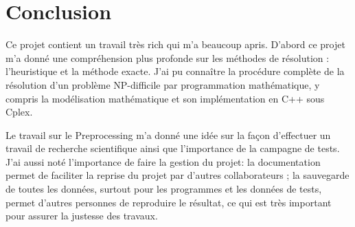 \chapter{Conclusion}
Ce projet contient un travail très rich qui m'a beaucoup apris. D'abord ce projet m'a donné une compréhension plus profonde sur les méthodes de résolution : l'heuristique et la méthode exacte. J'ai pu connaître la procédure complète de la résolution d'un problème NP-difficile par programmation mathématique, y compris la modélisation mathématique et son implémentation en C++ sous Cplex.

Le travail sur le Preprocessing m'a donné une idée sur la façon d'effectuer un travail de recherche scientifique ainsi que l'importance de la campagne de tests. J'ai aussi noté l'importance de faire la gestion du projet: la documentation permet de faciliter la reprise du projet par d'autres collaborateurs ; la sauvegarde de toutes les données, surtout pour les programmes et les données de tests, permet d'autres personnes de reproduire le résultat, ce qui est très important pour assurer la justesse des travaux.


